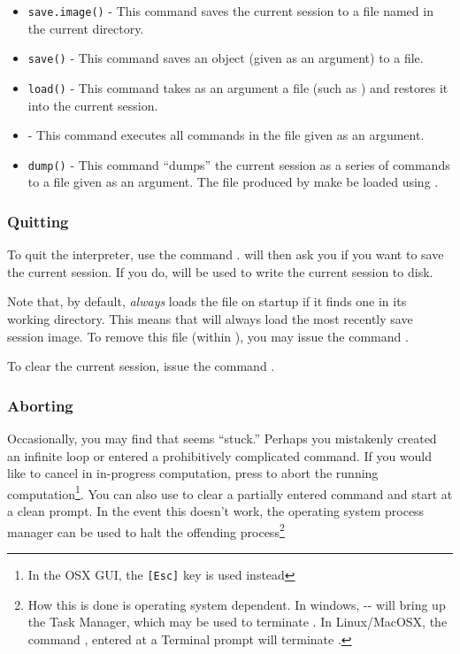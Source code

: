\documentclass[10pt,letterpaper]{article}
\begin{document}
\begin{itemize}
    \item \texttt{save.image()} - This command saves the current session to a file named  in the current directory.
    \item \texttt{save()} - This command saves an \R object (given as an argument) to a file.
    \item \texttt{load()} - This command takes as an argument a file (such as ) and restores it into the current session.
    \item {} - This command executes all \R commands in the file given as an argument.
    \item \texttt{dump()} - This command ``dumps'' the current session as a series of commands to a file given as an argument.  The file produced by  make be loaded using .
\end{itemize}


\subsubsection{Quitting} %
\label{ssub:quitting}

To quit the \R interpreter, use the command .  \R will then ask you if you want to save the current session.  If you do,  will be used to write the current session to disk.

Note that, by default, \R \emph{always} loads the file  on startup if it finds one in its working directory.  This means that \R will always load the most recently save session image.  To remove this file (within \R), you may issue the command .

To clear the current session, issue the command .


\subsubsection{Aborting} %
\label{ssub:aborting}

Occasionally, you may find that \R seems ``stuck.''  Perhaps you mistakenly created an infinite loop or entered a prohibitively complicated command.  If you would like to cancel in in-progress computation, press  to abort the running computation\footnote{In the OSX GUI, the \texttt{[Esc]} key is used instead}.  You can also use  to clear a partially entered command and start at a clean \Com{>} prompt.  In the event this doesn't work, the operating system process manager can be used to halt the offending process\footnote{How this is done is operating system dependent.  In windows, --\Com{[del]} will bring up the Task Manager, which may be used to terminate \R.  In Linux/MacOSX, the command , entered at a Terminal prompt will terminate \R.} 
\end{document}
